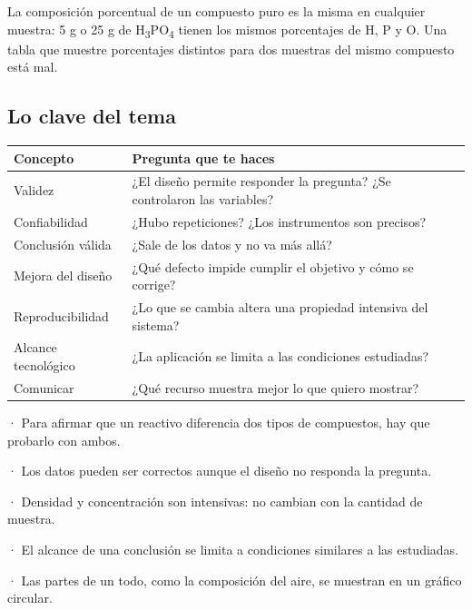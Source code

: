 \begin{clave} La composición porcentual de un compuesto puro es la misma en cualquier muestra: 5 g o 25 g de H\textsubscript{3}PO\textsubscript{4} tienen los mismos porcentajes de H, P y O. Una tabla que muestre porcentajes distintos para dos muestras del mismo compuesto está mal.\end{clave}
\subsection{Lo clave del tema}
\begin{center}\small
\begin{tabularx}{\linewidth}{@{}>{\raggedright\arraybackslash\hsize=0.64\hsize}X>{\raggedright\arraybackslash\hsize=1.36\hsize}X@{}}
\toprule
\textbf{Concepto} & \textbf{Pregunta que te haces} \\
\midrule
Validez & ¿El diseño permite responder la pregunta? ¿Se controlaron las variables? \\
Confiabilidad & ¿Hubo repeticiones? ¿Los instrumentos son precisos? \\
Conclusión válida & ¿Sale de los datos y no va más allá? \\
Mejora del diseño & ¿Qué defecto impide cumplir el objetivo y cómo se corrige? \\
Reproducibilidad & ¿Lo que se cambia altera una propiedad intensiva del sistema? \\
Alcance tecnológico & ¿La aplicación se limita a las condiciones estudiadas? \\
Comunicar & ¿Qué recurso muestra mejor lo que quiero mostrar? \\
\bottomrule
\end{tabularx}
\end{center}
 
\begin{clave}[{Recuerda}] · Para afirmar que un reactivo diferencia dos tipos de compuestos, hay que probarlo con ambos.\par · Los datos pueden ser correctos aunque el diseño no responda la pregunta.\par · Densidad y concentración son intensivas: no cambian con la cantidad de muestra.\par · El alcance de una conclusión se limita a condiciones similares a las estudiadas.\par · Las partes de un todo, como la composición del aire, se muestran en un gráfico circular.\end{clave}
 

